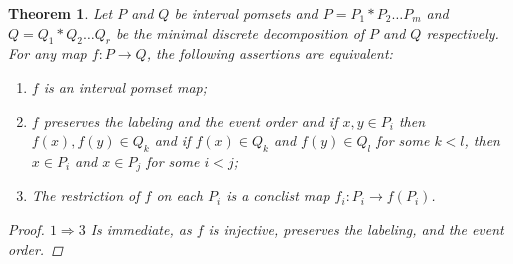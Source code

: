 \documentclass[11pt,a4paper,oldfontcommands]{memoir}
\newcommand*\exec{%
  \raisebox{1pt}{%
    \begin{tikzpicture}[x=.8ex,y=1ex,-]
      \draw (0,0) -- (1,0) -- (1,1) -- (2,1);
    \end{tikzpicture}}}
\newtheorem{theorem}[definition]{Theorem}
\begin{document}
\begin{theorem}\label{theo: conclist map glue}
Let $P$ and $Q$ be interval pomsets and $P=P_1*P_2 \dots P_m$ and $Q=Q_1*Q_2 \dots Q_r$ be the minimal discrete decomposition of $P$ and $Q$ respectively. For any map $f:P \to Q$, the following assertions are equivalent:
\begin{enumerate}
\item  $f$ is an interval pomset map;
   \item $f$ preserves the labeling and the event order and if $x,y \in P_i$ then $f(x), f(y) \in Q_k$ and if $f(x) \in Q_k$ and $f(y) \in Q_l$ for some $ k < l $, then $x \in P_i$ and $x \in P_j$ for some $ i < j $;
  \item The restriction of $f$ on each $P_i$ is a conclist map $f_i: P_i \to f(P_i)$.
\end{enumerate}
\begin{proof}
 $1 \Rightarrow 3$ Is immediate, as $f$ is injective, preserves the labeling, and the event order.
 

\end{proof}
\end{theorem}
\end{document}
